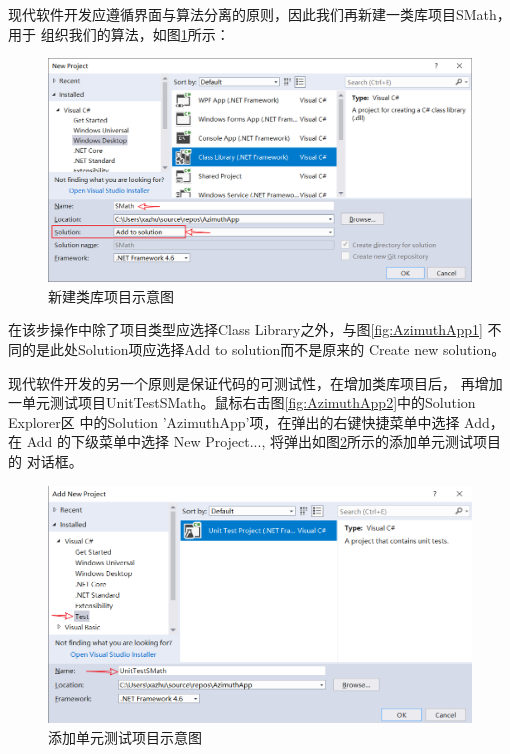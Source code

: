 现代软件开发应遵循界面与算法分离的原则，因此我们再新建一类库项目SMath，用于
组织我们的算法，如图\ref{fig:AzimuthApp3}所示：

\begin{figure}[htbp]
	\centering
	\includegraphics[scale=0.6]{surveybase/AzimuthApp3.png}
	\caption{新建类库项目示意图}
	\label{fig:AzimuthApp3}
\end{figure}

在该步操作中除了项目类型应选择Class Library之外，与图\ref{fig:AzimuthApp1}
不同的是此处Solution项应选择Add to solution而不是原来的 Create new solution。

现代软件开发的另一个原则是保证代码的可测试性，在增加类库项目后，
再增加一单元测试项目UnitTestSMath。鼠标右击图\ref{fig:AzimuthApp2}中的Solution Explorer区
中的Solution 'AzimuthApp'项，在弹出的右键快捷菜单中选择 Add，
在 Add 的下级菜单中选择 New Project..., 将弹出如图\ref{fig:AzimuthApp6}所示的添加单元测试项目的
对话框。

\begin{figure}[htbp]
	\centering
	\includegraphics[scale=0.6]{surveybase/AzimuthApp6.png}
	\caption{添加单元测试项目示意图}
	\label{fig:AzimuthApp6}
\end{figure}


